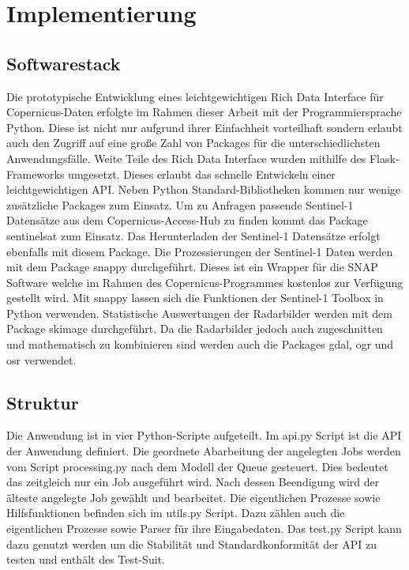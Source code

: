 \newpage
\restoregeometry
\section{Implementierung}
\subsection{Softwarestack}
Die prototypische Entwicklung eines leichtgewichtigen Rich Data Interface für Copernicus-Daten erfolgte im Rahmen dieser Arbeit mit der Programmiersprache Python.
Diese ist nicht nur aufgrund ihrer Einfachheit vorteilhaft sondern erlaubt auch den Zugriff auf eine große Zahl von Packages für die unterschiedlichsten 
Anwendungsfälle. 
Weite Teile des Rich Data Interface wurden mithilfe des Flask-Frameworks umgesetzt. Dieses erlaubt das schnelle Entwickeln einer leichtgewichtigen API.  
Neben Python Standard-Bibliotheken kommen nur wenige zusätzliche Packages zum Einsatz. Um zu Anfragen passende Sentinel-1 Datensätze aus dem 
Copernicus-Access-Hub zu finden kommt das Package sentinelsat zum Einsatz. Das Herunterladen der Sentinel-1 Datensätze erfolgt ebenfalls mit diesem Package. 
Die Prozessierungen der Sentinel-1 Daten werden mit dem Package snappy durchgeführt. 
Dieses ist ein Wrapper für die SNAP Software welche im Rahmen des Copernicus-Programmes kostenlos zur Verfügung 
gestellt wird. Mit snappy lassen sich die Funktionen der Sentinel-1 Toolbox in Python verwenden. 
Statistische Auswertungen der Radarbilder werden mit dem Package skimage durchgeführt. Da die Radarbilder jedoch auch zugeschnitten und 
mathematisch zu kombinieren sind werden auch die Packages gdal, ogr und osr verwendet. 

\subsection{Struktur}
Die Anwendung ist in vier Python-Scripte aufgeteilt. Im api.py Script ist die API der Anwendung definiert. 
Die geordnete Abarbeitung der angelegten Jobs werden vom Script processing.py nach dem Modell der Queue gesteuert. 
Dies bedeutet das zeitgleich nur ein Job ausgeführt wird. Nach dessen Beendigung wird der älteste angelegte Job gewählt und bearbeitet.
Die eigentlichen Prozesse sowie 
Hilfsfunktionen befinden sich im utils.py Script. Dazu zählen auch die eigentlichen Prozesse sowie Parser für 
ihre Eingabedaten. Das test.py Script kann dazu genutzt werden um die Stabilität und Standardkonformität der API zu testen und enthält des Test-Suit.

